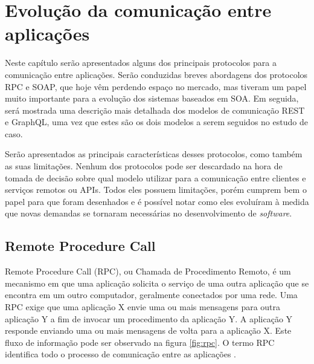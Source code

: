 \chapter[evolucao]{Evolução da comunicação entre aplicações}

Neste capítulo serão apresentados alguns dos principais protocolos para a comunicação entre aplicações. Serão conduzidas breves abordagens dos protocolos RPC e SOAP, que hoje vêm perdendo espaço no mercado, mas tiveram um papel muito importante para a evolução dos sistemas baseados em SOA. Em seguida, será mostrada uma descrição mais detalhada dos modelos de comunicação REST e GraphQL, uma vez que estes são os dois modelos a serem seguidos no estudo de caso.

Serão apresentados as principais características desses protocolos, como também as suas limitações. Nenhum dos protocolos pode ser descardado na hora de tomada de decisão sobre qual modelo utilizar para a comunicação entre clientes e serviços remotos ou APIs. Todos eles possuem limitações, porém cumprem bem o papel para que foram desenhados e é possível notar como eles evoluíram à medida que novas demandas se tornaram necessárias no desenvolvimento de \textit{software}.

\section{Remote Procedure Call}\label{sec:rpc}

Remote Procedure Call (RPC), ou Chamada de Procedimento Remoto, é um mecanismo em que uma aplicação solicita o serviço de uma outra aplicação que se encontra em um outro computador, geralmente conectados por uma rede. Uma RPC exige que uma aplicação X envie uma ou mais mensagens para outra aplicação Y a fim de invocar um procedimento da aplicação Y. A aplicação Y responde enviando uma ou mais mensagens de volta para a aplicação X. Este fluxo de informação pode ser observado na figura \ref{fig:rpc}. O termo RPC identifica todo o processo de comunicação entre as aplicações \cite{merrick2006xml}.

